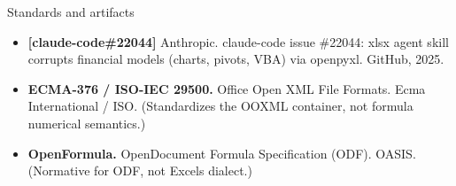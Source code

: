 \documentclass[
]{article}
\providecommand{\tightlist}{%
  \setlength{\itemsep}{0pt}\setlength{\parskip}{0pt}}
\begin{document}
Standards and artifacts

\begin{itemize}
\tightlist
\item
  \textbf{{[}claude-code\#22044{]}} Anthropic. claude-code issue
  \#22044: xlsx agent skill corrupts financial models (charts, pivots,
  VBA) via openpyxl. GitHub, 2025.
\item
  \textbf{ECMA-376 / ISO-IEC 29500.} Office Open XML File Formats. Ecma
  International / ISO. (Standardizes the OOXML container, not formula
  numerical semantics.)
\item
  \textbf{OpenFormula.} OpenDocument Formula Specification (ODF). OASIS.
  (Normative for ODF, not Excel\textquotesingle s dialect.)
\end{itemize}
\end{document}
